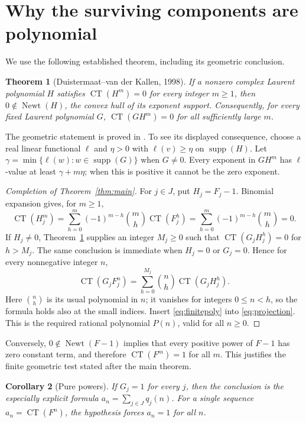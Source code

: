 \documentclass[11pt,a4paper]{article}
\newtheorem{theorem}{Theorem}[section]
\newtheorem{corollary}[theorem]{Corollary}
\theoremstyle{remark}\newtheorem{remark}[theorem]{Remark}
\newcommand{\CT}{\operatorname{CT}}
\newcommand{\Newt}{\operatorname{Newt}}
\newcommand{\supp}{\operatorname{supp}}
\begin{document}
\section{Why the surviving components are polynomial}

We use the following established theorem, including its geometric conclusion.

\begin{theorem}[Duistermaat--van der Kallen, 1998]\label{thm:dvk}
If a nonzero complex Laurent polynomial $H$ satisfies
$\CT(H^m)=0$ for every integer $m\ge1$, then
$0\notin\Newt(H)$, the convex hull of its exponent support.
Consequently, for every fixed Laurent polynomial $G$,
$\CT(GH^m)=0$ for all sufficiently large $m$.
\end{theorem}

The geometric statement is proved in \cite{DvK}. To see its displayed
consequence, choose a real linear functional $\ell$ and $\eta>0$ with
$\ell(v)\ge\eta$ on $\supp(H)$. Let
$\gamma=\min\{\ell(w):w\in\supp(G)\}$ when $G\ne0$.
Every exponent in $GH^m$ has $\ell$-value at least $\gamma+m\eta$;
when this is positive it cannot be the zero exponent.

\begin{proof}[Completion of Theorem~\ref{thm:main}]
For $j\in J$, put $H_j=F_j-1$. Binomial expansion gives, for $m\ge1$,
\[
 \CT(H_j^m)=\sum_{h=0}^m(-1)^{m-h}\binom mh\CT(F_j^h)
 =\sum_{h=0}^m(-1)^{m-h}\binom mh=0.
\]
If $H_j\ne0$, Theorem~\ref{thm:dvk} supplies an integer $M_j\ge0$ such that
$\CT(G_jH_j^h)=0$ for $h>M_j$. The same conclusion is immediate when
$H_j=0$ or $G_j=0$. Hence for every nonnegative integer $n$,
\begin{equation}\label{eq:finitepoly}
 \CT(G_jF_j^n)=
 \sum_{h=0}^{M_j}\binom nh\CT(G_jH_j^h).
\end{equation}
Here $\binom nh$ is its usual polynomial in $n$; it vanishes for integers
$0\le n<h$, so the formula holds also at the small indices.
Insert \eqref{eq:finitepoly} into \eqref{eq:projection}. This is the required
rational polynomial $P(n)$, valid for all $n\ge0$.
\end{proof}

Conversely, $0\notin\Newt(F-1)$ implies that every positive power of $F-1$
has zero constant term, and therefore $\CT(F^m)=1$ for all $m$.
This justifies the finite geometric test stated after the main theorem.

\begin{corollary}[Pure powers]
If $G_j=1$ for every $j$, then the conclusion is the especially explicit
formula $a_n=\sum_{j\in J}q_j(n)$.
For a single sequence $a_n=\CT(F^n)$, the hypothesis forces $a_n=1$ for all $n$.
\end{corollary}
\end{document}
